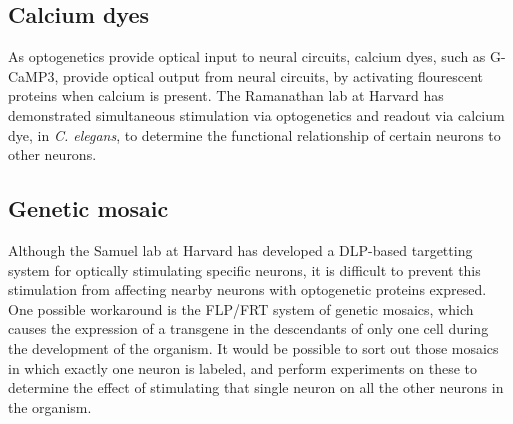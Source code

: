 \documentclass[letter,11pt]{article}
\newcommand{\cel}{{\em C. elegans}}
\begin{document}
\subsection{Calcium dyes}

As optogenetics provide optical input to neural circuits, calcium dyes, such as
G-CaMP3, provide optical output from neural circuits, by activating flourescent
proteins when calcium is present. The Ramanathan lab at Harvard has demonstrated
simultaneous stimulation via optogenetics and readout via calcium dye, in \cel,
to determine the functional relationship of certain neurons to other neurons.

\subsection{Genetic mosaic}

Although the Samuel lab at Harvard has developed a DLP-based targetting system
for optically stimulating specific neurons, it is difficult to prevent this
stimulation from affecting nearby neurons with optogenetic proteins expresed.
One possible workaround is the FLP/FRT system of genetic mosaics, which causes
the expression of a transgene in the descendants of only one cell during the
development of the organism. It would be possible to sort out those mosaics in
which exactly one neuron is labeled, and perform experiments on these to
determine the effect of stimulating that single neuron on all the other neurons
in the organism.
\end{document}
